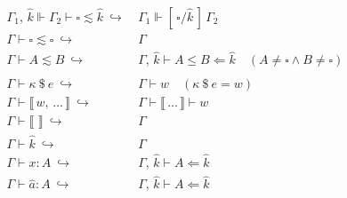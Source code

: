 \documentclass{article}
\newcommand{\acheck}[3]{#1 \le #2 \Leftarrow #3}
\newcommand{\scheck}[2]{#1 \Leftarrow #2}
\newcommand{\compact}[2]{#1 \lesssim #2}
\newcommand{\capp}[2][\kappa]{#1 ~\$~ #2}
\newcommand{\kvar}{\hat{k}}
\newcommand{\wlred}{~\hookrightarrow~ &}
\newcommand{\wlgroup}[1]{\llbracket\, #1 \,\rrbracket}
\newcommand{\exb}[2][a]{\hat{#1} : #2}
\newcommand{\subst}[3][x]{[\,#2 / #1\,]\,#3}
\newcommand{\ksubst}[3][k]{\subst[\hat{#1}]{#2}{#3}}
\begin{document}
\begin{align*}
    \Gamma_1 ,\, \kvar \Vdash \Gamma_2 \vdash \compact{\square}{\kvar} \wlred
        \Gamma_1 \Vdash \ksubst{\square}{\Gamma_2}  \\
    \Gamma \vdash \compact{\square}{\square} \wlred \Gamma  \\
    \Gamma \vdash \compact{A}{B} \wlred
        \Gamma ,\, \kvar \vdash \acheck{A}{B}{\kvar} \quad (A \neq \square \land B \neq \square)\\
    \\
    \Gamma \vdash \capp{e} \wlred \Gamma \vdash w \quad (\capp{e} = w) \\
    \Gamma \vdash \wlgroup{w ,\, \dots} \wlred \Gamma \vdash \wlgroup{\dots} \vdash w \\
    \Gamma \vdash \wlgroup{} \wlred \Gamma \\
    \Gamma \vdash \kvar \wlred \Gamma \\
    \Gamma \vdash x : A \wlred \Gamma ,\, \kvar \vdash \scheck{A}{\kvar} \\
    \Gamma \vdash \exb{A} \wlred \Gamma ,\, \kvar \vdash \scheck{A}{\kvar} \\
\end{align*}
\end{document}
